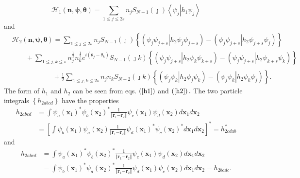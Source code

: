 \documentclass[aps,preprint]{revtex4}%
\begin{document}
\begin{equation}
\mathcal{H}_{1}\left(  \mathbf{n},\mathbf{\psi},\mathbf{\theta}\right)
=\sum_{1\leq j\leq2s}n_{j}S_{N-1}\left(  \jmath\right)  \left\langle \left.
\psi_{j}\right\vert h_{1}\psi_{j}\right\rangle
\end{equation}
and
\begin{align}
&  \mathcal{H}_{2}\left(  \mathbf{n},\mathbf{\psi},\mathbf{\theta}\right)
=\sum_{1\leq j\leq2s}n_{j}S_{N-1}\left(  \jmath\right)  \left\{  \left(
\left.  \psi_{j}\psi_{j+s}\right\vert h_{2}\psi_{j}\psi_{j+s}\right)  -\left(
\left.  \psi_{j}\psi_{j+s}\right\vert h_{2}\psi_{j+s}\psi_{j}\right)  \right\}
\nonumber\\
&  \qquad+\sum_{1\leq j,k\leq s}n_{j}^{\frac{1}{2}}n_{k}^{\frac{1}{2}%
}e^{i\left(  \theta_{j}-\theta_{k}\right)  }S_{N-1}\left(  \jmath k\right)
\left\{  \left(  \left.  \psi_{j}\psi_{j+s}\right\vert h_{2}\psi_{k}\psi
_{k+s}\right)  -\left(  \left.  \psi_{j}\psi_{j+s}\right\vert h_{2}\psi
_{k+s}\psi_{k}\right)  \right\} \nonumber\\
&  \qquad\qquad\qquad+\frac{1}{2}\sum_{1\leq j,k\leq2s}n_{j}n_{k}%
S_{N-2}\left(  \jmath k\right)  \overset{}{\left\{  \left(  \left.  \psi
_{j}\psi_{k}\right\vert h_{2}\psi_{j}\psi_{k}\right)  -\left(  \left.
\psi_{j}\psi_{k}\right\vert h_{2}\psi_{k}\psi_{j}\right)  \right\}  }.
\end{align}
The form of $h_{1}$ and $h_{2}$ can be seen from eqs. $\left(  \ref{h1}%
\right)  $ and $\left(  \ref{h2}\right)  .$ The two particle integrals
$\left\{  h_{2abcd}\right\}  $ have the properties
\begin{align}
h_{2abcd}  &  =\int\psi_{a}\left(  \mathbf{x}_{1}\right)  ^{\ast}\psi
_{b}\left(  \mathbf{x}_{2}\right)  ^{\ast}\frac{1}{\left\Vert \mathbf{r}%
_{1}\mathbf{-r}_{2}\right\Vert }\psi_{c}\left(  \mathbf{x}_{1}\right)
\psi_{d}\left(  \mathbf{x}_{2}\right)  d\mathbf{x}_{1}d\mathbf{x}%
_{2}\nonumber\\
&  =\left[  \int\psi_{b}\left(  \mathbf{x}_{1}\right)  \psi_{a}\left(
\mathbf{x}_{2}\right)  \frac{1}{\left\Vert \mathbf{r}_{1}\mathbf{-r}%
_{2}\right\Vert }\psi_{d}\left(  \mathbf{x}_{1}\right)  ^{\ast}\psi_{c}\left(
\mathbf{x}_{2}\right)  ^{\ast}d\mathbf{x}_{1}d\mathbf{x}_{2}\right]  ^{\ast
}=h_{2cdab}^{\ast}%
\end{align}
and
\begin{align}
h_{2abcd}  &  =\int\psi_{a}\left(  \mathbf{x}_{1}\right)  ^{\ast}\psi
_{b}\left(  \mathbf{x}_{2}\right)  ^{\ast}\frac{1}{\left\Vert \mathbf{r}%
_{1}\mathbf{-r}_{2}\right\Vert }\psi_{c}\left(  \mathbf{x}_{1}\right)
\psi_{d}\left(  \mathbf{x}_{2}\right)  d\mathbf{x}_{1}d\mathbf{x}%
_{2}\nonumber\\
&  =\int\psi_{b}\left(  \mathbf{x}_{1}\right)  ^{\ast}\psi_{a}\left(
\mathbf{x}_{2}\right)  ^{\ast}\frac{1}{\left\Vert \mathbf{r}_{1}%
\mathbf{-r}_{2}\right\Vert }\psi_{d}\left(  \mathbf{x}_{1}\right)  \psi
_{c}\left(  \mathbf{x}_{2}\right)  d\mathbf{x}_{1}d\mathbf{x}_{2}=h_{2badc}.
\end{align}
\end{document}
